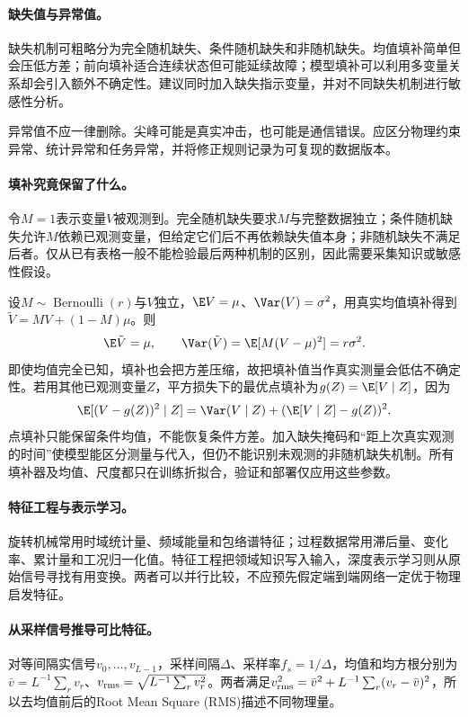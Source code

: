 \paragraph{缺失值与异常值。}
缺失机制可粗略分为完全随机缺失、条件随机缺失和非随机缺失。均值填补简单但会压低方差；前向填补适合连续状态但可能延续故障；模型填补可以利用多变量关系却会引入额外不确定性。建议同时加入缺失指示变量，并对不同缺失机制进行敏感性分析。

异常值不应一律删除。尖峰可能是真实冲击，也可能是通信错误。应区分物理约束异常、统计异常和任务异常，并将修正规则记录为可复现的数据版本。

\paragraph{填补究竟保留了什么。}
令$M=1$表示变量$V$被观测到。完全随机缺失要求$M$与完整数据独立；条件随机缺失允许$M$依赖已观测变量，但给定它们后不再依赖缺失值本身；非随机缺失不满足后者。仅从已有表格一般不能检验最后两种机制的区别，因此需要采集知识或敏感性假设。

设$M\sim\operatorname{Bernoulli}(r)$与$V$独立，$\E V=\mu$、$\Var(V)=\sigma^2$，用真实均值填补得到$\tilde V=MV+(1-M)\mu$。则
\begin{equation}
 \E\tilde V=\mu,\qquad
 \Var(\tilde V)=\E[M(V-\mu)^2]=r\sigma^2.
\end{equation}
即使均值完全已知，填补也会把方差压缩，故把填补值当作真实测量会低估不确定性。若用其他已观测变量$Z$，平方损失下的最优点填补为$g(Z)=\E[V\mid Z]$，因为
\begin{equation}
 \E[(V-g(Z))^2\mid Z]
 =\Var(V\mid Z)+(\E[V\mid Z]-g(Z))^2.
\end{equation}
点填补只能保留条件均值，不能恢复条件方差。加入缺失掩码和“距上次真实观测的时间”使模型能区分测量与代入，但仍不能识别未观测的非随机缺失机制。所有填补器及均值、尺度都只在训练折拟合，验证和部署仅应用这些参数。

\paragraph{特征工程与表示学习。}
旋转机械常用时域统计量、频域能量和包络谱特征；过程数据常用滞后量、变化率、累计量和工况归一化值。特征工程把领域知识写入输入，深度表示学习则从原始信号寻找有用变换。两者可以并行比较，不应预先假定端到端网络一定优于物理启发特征。

\paragraph{从采样信号推导可比特征。}
对等间隔实信号$v_0,\ldots,v_{L-1}$，采样间隔$\Delta$、采样率$f_s=1/\Delta$，均值和均方根分别为$\bar v=L^{-1}\sum_rv_r$、$v_{\rm rms}=\sqrt{L^{-1}\sum_rv_r^2}$。两者满足$v_{\rm rms}^2=\bar v^2+L^{-1}\sum_r(v_r-\bar v)^2$，所以去均值前后的Root Mean Square (RMS)描述不同物理量。

